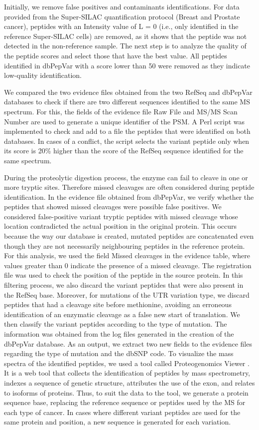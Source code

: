 \documentclass{ieeeaccess}
\begin{document}
Initially, we remove false positives and contaminants identifications. For data provided from the Super-SILAC quantification protocol (Breast and Prostate cancer), peptides with an Intensity value of L = 0 (i.e., only identified in the reference Super-SILAC cells) are removed, as it shows that the peptide was not detected in the non-reference sample. The next step is to analyze the quality of the peptide scores and select those that have the best value. All peptides identified in dbPepVar with a score lower than 50 were removed as they indicate low-quality identification.

We compared the two evidence files obtained from the two RefSeq and dbPepVar databases to check if there are two different sequences identified to the same MS spectrum. For this, the fields of the evidence file Raw File and MS/MS Scan Number are used to generate a unique identifier of the PSM. A Perl script was implemented to check and add to a file the peptides that were identified on both databases. In cases of a conflict, the script selects the variant peptide only when its score is 20\% higher than the score of the RefSeq sequence identified for the same spectrum.

During the proteolytic digestion process, the enzyme can fail to cleave in one or more tryptic sites. Therefore missed cleavages are often considered  during peptide identification. In the evidence file obtained from dbPepVar, we verify whether the peptides that showed missed cleavages were possible false positives. We considered false-positive variant tryptic peptides with missed cleavage whose location contradicted the actual position in the original protein. This occurs because the way our database is created, mutated peptides are concatenated even though they are not necessarily neighbouring peptides in the reference protein. For this analysis, we used the field Missed cleavages in the evidence  table, where values greater than 0 indicate the presence of a missed cleavage. The registration file was used to check the position of the peptide in the source protein. In this filtering process, we also discard the variant peptides that were also present in the RefSeq base. Moreover, for mutations of the UTR variation type, we discard peptides that had a cleavage site before methionine, avoiding an erroneous identification of an enzymatic cleavage as a false new start of translation.
We then classify the variant peptides according to the type of mutation. The information was obtained from the log files generated in the creation of the dbPepVar database. As an output, we extract two new fields to the evidence files regarding the type of mutation and the dbSNP code. To visualize the mass spectra of the identified peptides, we used a tool called Proteogenomics Viewer \cite{Kroll2017-ab}. It is a web tool that collects the identification of peptides by mass spectrometry, indexes a sequence of genetic structure, attributes the use of the exon, and relates to isoforms of proteins. Thus, to suit the data to the tool, we generate a protein sequence base, replacing the reference sequence or peptides used by the MS for each type of cancer. In cases where different variant peptides are used for the same protein and position, a new sequence is generated for each variation.
\end{document}
